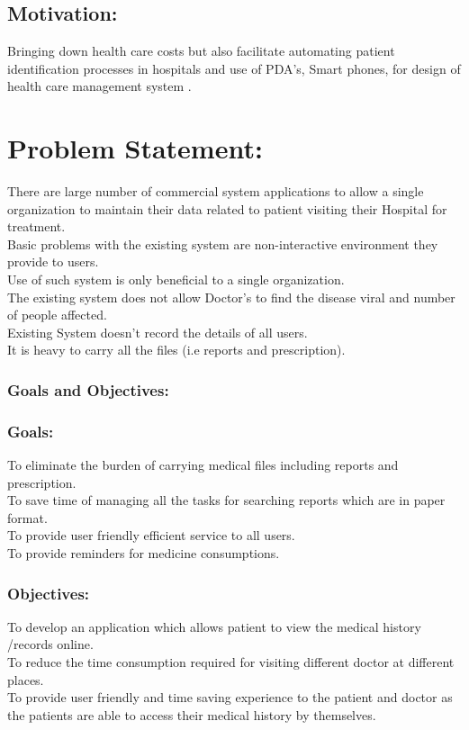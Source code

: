 \documentclass[12pt,]{article}
\begin{document}
\subsection{Motivation:}
 Bringing down health care costs but also facilitate automating patient identification processes in hospitals and use of PDA’s, Smart phones, for design of health care management system . 
\section{Problem Statement:}
There are large number of commercial system applications to allow a single organization to maintain their data related to patient visiting their Hospital for treatment.\\ Basic problems with the existing system are non-interactive environment they provide to users.\\ Use of such system is only beneficial to a single organization.\\ The existing system does not allow Doctor's to find the disease viral and number of people affected.\\ Existing System doesn't record the details of all users.\\ It is heavy to carry all the files (i.e reports and prescription). 
\subsubsection{Goals and Objectives:}
\subsubsection{Goals:}
 To eliminate the burden of carrying medical files including reports and prescription.\\To save time of managing all the tasks for searching reports which are in paper format.\\ To provide user friendly efficient service to all users.\\ To provide reminders for medicine consumptions. 
\subsubsection{Objectives:}
To develop an application which  allows patient to view the medical history /records online.\\ To reduce the time consumption required for visiting different doctor at different places.\\ To provide user friendly and time saving experience to the patient and doctor as the patients  are able to access their medical history by themselves.
 
\end{document}
